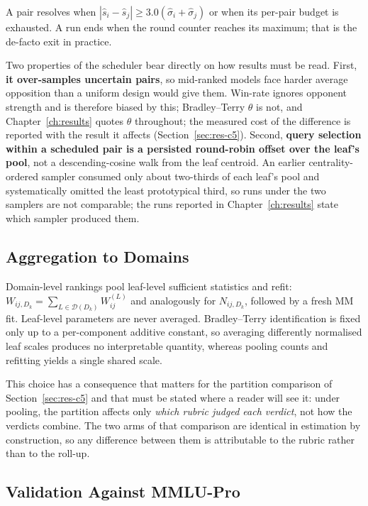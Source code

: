 A pair resolves when
$|\hat{s}_i - \hat{s}_j| \geq 3.0(\hat{\sigma}_i + \hat{\sigma}_j)$ or
when its per-pair budget is exhausted. A run ends when the round
counter reaches its maximum; that is the de-facto exit in practice.

Two properties of the scheduler bear directly on how results must be
read. First, \textbf{it over-samples uncertain pairs}, so mid-ranked
models face harder average opposition than a uniform design would give
them. Win-rate ignores opponent strength and is therefore biased by
this; Bradley--Terry $\theta$ is not, and Chapter~\ref{ch:results}
quotes $\theta$ throughout; the measured cost of the difference is
reported with the result it affects (Section~\ref{sec:res-c5}).
Second, \textbf{query selection within a scheduled pair is a persisted
round-robin offset over the leaf's pool}, not a descending-cosine walk
from the leaf centroid. An earlier centrality-ordered sampler consumed
only about two-thirds of each leaf's pool and systematically omitted the
least prototypical third, so runs under the two samplers are not
comparable; the runs reported in Chapter~\ref{ch:results} state which
sampler produced them.

\subsection{Aggregation to Domains}\label{sec:meth-aggregation}

Domain-level rankings pool leaf-level sufficient statistics and refit:
$W_{ij,D_k} = \sum_{L \in \mathcal{D}(D_k)} W_{ij}^{(L)}$ and
analogously for $N_{ij,D_k}$, followed by a fresh MM fit.
Leaf-level parameters are never averaged. Bradley--Terry identification
is fixed only up to a per-component additive constant, so averaging
differently normalised leaf scales produces no interpretable quantity,
whereas pooling counts and refitting yields a single shared scale.

This choice has a consequence that matters for the partition
comparison of Section~\ref{sec:res-c5} and that must be stated where a
reader will see it: under pooling, the partition affects only
\emph{which rubric judged each verdict}, not how the verdicts combine.
The two arms of that comparison are identical in estimation by
construction, so any difference between them is attributable to the
rubric rather than to the roll-up.

\subsection{Validation Against MMLU-Pro}\label{sec:meth-validation}

